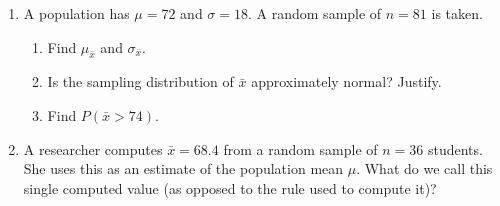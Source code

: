 \documentclass[10pt]{article}
\begin{document}
\namedateperiod

\vspace{0.15in}

\begin{enumerate}

  \item A population has $\mu = 72$ and $\sigma = 18$. A random sample of $n = 81$ is taken.
        \begin{enumerate}[label=\alph*.]
          \item Find $\mu_{\bar{x}}$ and $\sigma_{\bar{x}}$.
                \vspace{0.6in}
          \item Is the sampling distribution of $\bar{x}$ approximately normal? Justify.
          \item Find $P(\bar{x} > 74)$.
                \vspace{0.8in}
        \end{enumerate}

  \item A researcher computes $\bar{x} = 68.4$ from a random sample of $n = 36$ students.
        She uses this as an estimate of the population mean $\mu$. What do we call this
        single computed value (as opposed to the rule used to compute it)?

\end{enumerate}
\end{document}
